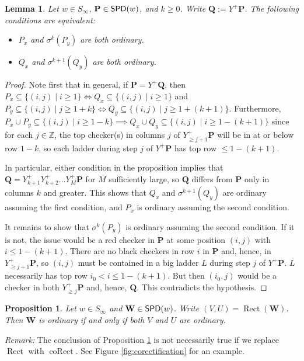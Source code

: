\documentclass[11pt,reqno]{amsart} %
\newcommand{\bbZ}{\mathbb{Z}}
\newcommand{\bfP}{\mathbf{P}}
\newcommand{\bfQ}{\mathbf{Q}}
\newcommand{\bfW}{\mathbf{W}}
\newcommand{\sseq}{\subseteq}
\DeclareMathOperator{\SPD}{\sf{SPD}}
\DeclareMathOperator{\Rect}{Rect} %
\DeclareMathOperator{\coRect}{coRect} %
\newtheorem{proposition}[theorem]{Proposition}
\newtheorem{lemma}[theorem]{Lemma}
\theoremstyle{definition}
\begin{document}
\begin{lemma}
\label{lem:Y+ preserves ordinary}
Let $w\in S_\infty$, $\bfP\in \SPD(w)$, and $k\geq 0$.
Write $\bfQ := Y^+\bfP$.
The following conditions are equivalent:
\begin{itemize}
    \item
    $P_x$ and $\sigma^k(P_y)$ are both ordinary.
    \item 
    $Q_x$ and $\sigma^{k+1}(Q_y)$ are both ordinary.
\end{itemize}
\end{lemma}

\begin{proof}
Note first that in general, if $\bfP = Y^+\bfQ$, then
$P_x\sseq \{(i,j) \mid i\geq 1\} \iff Q_x\sseq \{(i,j) \mid i\geq 1\}$ and $P_y\sseq \{(i,j)\mid j\geq 1+k\} \iff Q_y\sseq \{(i,j)\mid j\geq 1+(k+1)\}$.
Furthermore, $P_x\cup P_y\sseq \{(i,j) \mid i\geq 1-k\} \implies Q_x\cup Q_y\sseq \{(i,j)\mid i\geq 1-(k+1)\}$ since for each $j\in\bbZ$, the top checker(s) in columns $j$ of $Y^+_{\geq j+1}\bfP$ will be in at or below row $1-k$, so each ladder during step $j$ of $Y^+\bfP$ has top row $\leq 1-(k+1)$.

In particular, either condition in the proposition implies that $\bfQ = Y^+_{k+1}Y^+_{k+2}\dots Y^+_M\bfP$ for $M$ sufficiently large, so $\bfQ$ differs from $\bfP$ only in columns $k$ and greater.
This shows that $Q_x$ and $\sigma^{k+1}(Q_y)$ are ordinary assuming the first condition, and $P_x$ is ordinary assuming the second condition.

It remains to show that $\sigma^k(P_y)$ is ordinary assuming the second condition.
If it is not, the issue would be a red checker in $\bfP$ at some position $(i,j)$ with $i \leq 1-(k+1)$.
There are no black checkers in row $i$ in $\bfP$ and, hence, in $Y^+_{\geq j+1}\bfP$, so $(i,j)$ must be contained in a big ladder $L$ during step $j$ of $Y^+\bfP$.
$L$ necessarily has top row $i_0 < i \leq 1-(k+1)$.
But then $(i_0,j)$ would be a checker in both $Y^+_{\geq j}\bfP$ and, hence, $\bfQ$.
This contradicts the hypothesis.
\end{proof}

\begin{proposition}
\label{prop:rectification preserves ordinary}
Let $w\in S_\infty$ and $\bfW\in \SPD(w)$.
Write $(V,U) = \Rect(\bfW)$.
Then $\bfW$ is ordinary if and only if both $V$ and $U$ are ordinary.
\end{proposition}

\noindent
\textit{Remark:}\quad
The conclusion of Proposition \ref{prop:rectification preserves ordinary} is not necessarily true if we replace $\Rect$ with $\coRect$.
See Figure \ref{fig:corectification} for an example.
\vspace{4pt}
\end{document}
